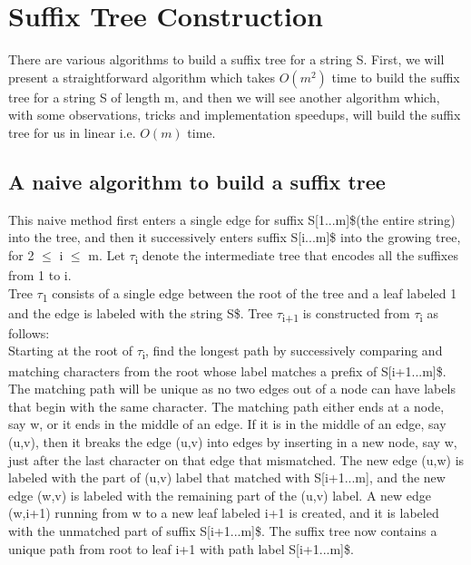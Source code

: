 \documentclass[11pt,a4paper]{article}
\begin{document}
\section{Suffix Tree Construction}
There are various algorithms to build a suffix tree for a string S. First, we will present a straightforward algorithm which takes \begin{math}O(m^2)\end{math} time to build the suffix tree for a string S of length m, and then we will see another algorithm which, with some observations, tricks and implementation speedups, will build the suffix tree for us in linear i.e. \begin{math}O(m)\end{math} time.

\subsection{A naive algorithm to build a suffix tree}
\label{subsec:algorithm1}
This naive method first enters a single edge for suffix S[1...m]\$(the entire string) into the tree, and then it successively enters suffix S[i...m]\$ into the growing tree, for 2 $\le$ i $\le$ m. Let \begin{math}\tau\end{math}\textsubscript{i} denote the intermediate tree that encodes all the suffixes from 1 to i. 
\\
Tree \begin{math}\tau\end{math}\textsubscript{1} consists of a single edge between the root of the tree and a leaf labeled 1 and the edge is labeled with the string S\$. Tree \begin{math}\tau\end{math}\textsubscript{i+1} is constructed from \begin{math}\tau\end{math}\textsubscript{i} as follows:
\\
Starting at the root of \begin{math}\tau\end{math}\textsubscript{i}, find the longest path by successively comparing and matching characters from the root whose label matches a prefix of S[i+1...m]\$. The matching path will be unique as no two edges out of a node can have labels that begin with the same character. The matching path either ends at a node, say w, or it ends in the middle of an edge. If it is in the middle of an edge, say (u,v), then it breaks the edge (u,v) into edges by inserting in a new node, say w, just after the last character on that edge that mismatched. The new edge (u,w) is labeled with the part of (u,v) label that matched with S[i+1...m], and the new edge (w,v) is labeled with the remaining part of the (u,v) label. A new edge (w,i+1) running from w to a new leaf labeled i+1 is created, and it is labeled with the unmatched part of suffix S[i+1...m]\$. The suffix tree now contains a unique path from root to leaf i+1 with path label S[i+1...m]\$.
\end{document}
